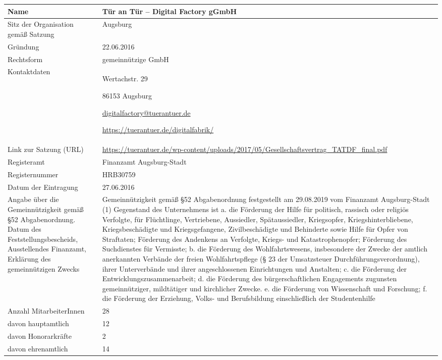 \documentclass[12pt, a4paper]{article} %
\begin{document}
\noindent\begin{adjustwidth}{-1cm}{-1cm}
  \begin{tabularx}{\textwidth+2cm}{p{5cm}X}
  \toprule
  Name & Tür an Tür – Digital Factory gGmbH\tabularnewline
  \midrule
  Sitz der Organisation gemäß Satzung & Augsburg\tabularnewline
  \midrule
  Gründung & 22.06.2016\tabularnewline
  \midrule
  Rechtsform & gemeinnützige GmbH\tabularnewline
  \midrule
  \begin{minipage}[t]{0.47\columnwidth}\raggedright
  Kontaktdaten\strut
  \end{minipage} & \begin{minipage}[t]{\columnwidth}
  Wertachstr. 29
  
  86153 Augsburg
  
  \href{mailto:digitalfactory@tuerantuer.de}{\url{digitalfactory@tuerantuer.de}}
  
  \url{https://tuerantuer.de/digitalfabrik/}
  \end{minipage}\tabularnewline
  \midrule
  Link zur Satzung (URL) & \url{https://tuerantuer.de/wp-content/uploads/2017/05/Gesellschaftsvertrag\_TATDF\_final.pdf}\tabularnewline
  \midrule
  Registeramt & Finanzamt Augsburg-Stadt\tabularnewline
  Registernummer & HRB30759\tabularnewline
  Datum der Eintragung & 27.06.2016\tabularnewline
  \midrule
  Angabe über die Gemeinnützigkeit gemäß §52 Abgabenordnung. Datum des
Feststellungsbescheids, Ausstellendes Finanzamt, Erklärung des
gemeinnützigen Zwecks & Gemeinnützigkeit gemäß §52 Abgabenordnung festgestellt am 29.08.2019 vom
  Finanzamt Augsburg-Stadt 
  (1) Gegenstand des Unternehmens ist a. die Förderung der Hilfe für
  politisch, rassisch oder religiös Verfolgte, für Flüchtlinge,
  Vertriebene, Aussiedler, Spätaussiedler, Kriegsopfer,
  Kriegshinterbliebene, Kriegsbeschädigte und Kriegsgefangene,
  Zivilbeschädigte und Behinderte sowie Hilfe für Opfer von Straftaten;
  Förderung des Andenkens an Verfolgte, Kriegs- und Katastrophenopfer;
  Förderung des Suchdienstes für Vermisste; b. die Förderung des
  Wohlfahrtswesens, insbesondere der Zwecke der amtlich anerkannten
  Verbände der freien Wohlfahrtspflege (§ 23 der Umsatzsteuer
  Durchführungsverordnung), ihrer Unterverbände und ihrer angeschlossenen
  Einrichtungen und Anstalten; c. die Förderung der
  Entwicklungszusammenarbeit; d. die Förderung des bürgerschaftlichen
  Engagements zugunsten gemeinnütziger, mildtätiger und kirchlicher
  Zwecke. e. die Förderung von Wissenschaft und Forschung; f. die
  Förderung der Erziehung, Volks- und Berufsbildung einschließlich der
  Studentenhilfe\tabularnewline
  \midrule
  Anzahl MitarbeiterInnen & 28 \tabularnewline
  davon hauptamtlich & 12 \tabularnewline
  davon Honorarkräfte & 2 \tabularnewline
  davon ehrenamtlich & 14 \tabularnewline
  \bottomrule
  \end{tabularx}
  \end{adjustwidth}
\end{document}
